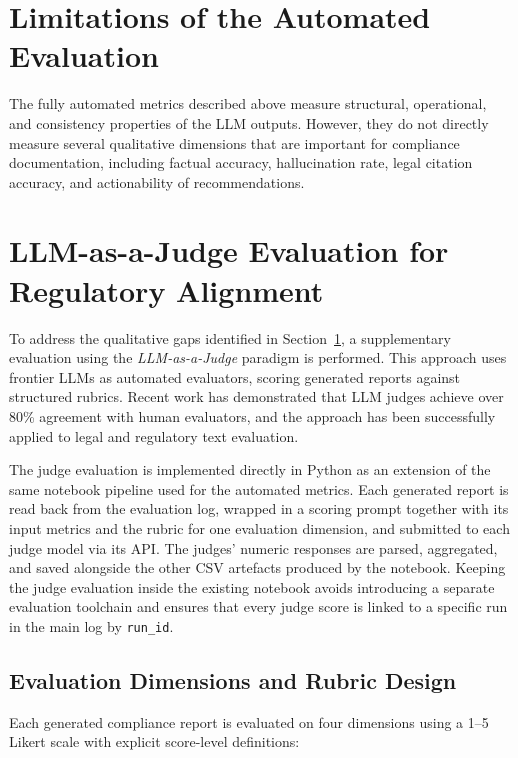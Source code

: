 \documentclass[]{UCD_CS_FYP_Report}
\begin{document}
\section{Limitations of the Automated Evaluation}
\label{sec:eval_limitations}

The fully automated metrics described above measure structural, operational, and consistency properties of the LLM outputs. However, they do not directly measure several qualitative dimensions that are important for compliance documentation, including factual accuracy, hallucination rate, legal citation accuracy, and actionability of recommendations.

\section{LLM-as-a-Judge Evaluation for Regulatory Alignment}
\label{sec:llm_judge_methodology}
 
To address the qualitative gaps identified in Section~\ref{sec:eval_limitations}, a supplementary evaluation using the \textit{LLM-as-a-Judge} paradigm\cite{ZhengMTBench2023} is performed. This approach uses frontier LLMs as automated evaluators, scoring generated reports against structured rubrics. Recent work has demonstrated that LLM judges achieve over 80\% agreement with human evaluators\cite{ZhengMTBench2023}, and the approach has been successfully applied to legal and regulatory text evaluation\cite{LeMAJ2025}.
 
The judge evaluation is implemented directly in Python as an extension of the same notebook pipeline used for the automated metrics. Each generated report is read back from the evaluation log, wrapped in a scoring prompt together with its input metrics and the rubric for one evaluation dimension, and submitted to each judge model via its API. The judges' numeric responses are parsed, aggregated, and saved alongside the other CSV artefacts produced by the notebook. Keeping the judge evaluation inside the existing notebook avoids introducing a separate evaluation toolchain and ensures that every judge score is linked to a specific run in the main log by \texttt{run\_id}.
 
\subsection{Evaluation Dimensions and Rubric Design}
 
Each generated compliance report is evaluated on four dimensions using a 1--5 Likert scale with explicit score-level definitions:
 
\end{document}

